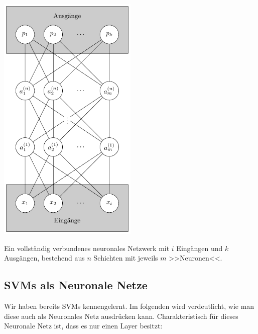 \begin{dsafigure}
	\begin{center}
		\includegraphics[width=0.5\textwidth]{Figure_NN}
		\caption{Ein vollständig verbundenes neuronales Netzwerk mit $i$ Eingängen und $k$ Ausgängen, bestehend aus $n$ Schichten mit jeweils $m$ >>Neuronen<<.}
		\label{FigNN}
	\end{center}
\end{dsafigure}

\subsection{SVMs als Neuronale Netze}

Wir haben bereits SVMs kennengelernt. Im folgenden wird verdeutlicht, wie man diese auch als Neuronales Netz ausdrücken kann. Charakteristisch für dieses Neuronale Netz ist, dass es nur einen Layer besitzt:

%
%
%

